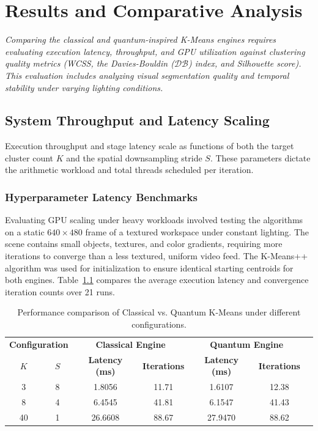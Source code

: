 \chapter{Results and Comparative Analysis}\label{chap:results}
{\itshape Comparing the classical and quantum-inspired K-Means engines requires evaluating execution latency, throughput, and GPU utilization against clustering quality metrics (WCSS, the Davies-Bouldin ($\mathcal{D}\mathcal{B}$) index, and Silhouette score). This evaluation includes analyzing visual segmentation quality and temporal stability under varying lighting conditions.}

\section{System Throughput and Latency Scaling}
Execution throughput and stage latency scale as functions of both the target cluster count $K$ and the spatial downsampling stride $S$. These parameters dictate the arithmetic workload and total threads scheduled per iteration.

\subsection{Hyperparameter Latency Benchmarks}
Evaluating GPU scaling under heavy workloads \cite{farivar2008parallel, cook2012cuda} involved testing the algorithms on a static $640 \times 480$ frame of a textured workspace under constant lighting. The scene contains small objects, textures, and color gradients, requiring more iterations to converge than a less textured, uniform video feed. The K-Means++ algorithm \cite{arthur2007k} was used for initialization to ensure identical starting centroids for both engines. Table~\ref{tab:latency_benchmarks} compares the average execution latency and convergence iteration counts over 21 runs.

\begin{table}[H]
\centering
\caption[Execution Latency and Iteration Counts across Configurations]{Performance comparison of Classical vs. Quantum K-Means under different configurations.}
\label{tab:latency_benchmarks}
\begin{tabular}{ccccccc}
\hline
\multicolumn{2}{c}{\textbf{Configuration}} & \multicolumn{2}{c}{\textbf{Classical Engine}} & \multicolumn{2}{c}{\textbf{Quantum Engine}} \\
\textbf{$K$} & \textbf{$S$} & \textbf{Latency (ms)} & \textbf{Iterations} & \textbf{Latency (ms)} & \textbf{Iterations} \\ \hline
3  & 8  & 1.8056  & 11.71  & 1.6107  & 12.38  \\
8  & 4  & 6.4545  & 41.81  & 6.1547  & 41.43  \\
40 & 1  & 26.6608 & 88.67  & 27.9470 & 88.62  \\ \hline
\end{tabular}
\end{table}

